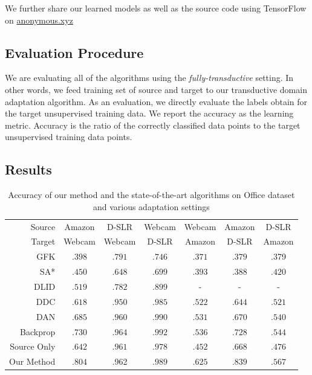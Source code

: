 We further share our learned models as well as the source code using TensorFlow\cite{tensorflow} on \url{anonymous.xyz}

\subsection{Evaluation Procedure}
We are evaluating all of the algorithms using the \emph{fully-transductive} setting. In other words,  we feed training set of source and target to our transductive domain adaptation algorithm. As an evaluation, we directly evaluate the labels obtain for the target unsupervised training data. We report the accuracy as the learning metric. Accuracy is the ratio of the correctly classified data points to the target unsupervised training data points.

\subsection{Results}
\begin{table}[t]
\caption{Accuracy of our method and the state-of-the-art algorithms on Office dataset and various adaptation settings}
\label{tab:res}
\begin{sc}
\begin{center}
\begin{small}
\begin{tabular}{@{}rcccccc@{}} \toprule 
 Source & Amazon & D-SLR & Webcam & Webcam &Amazon & D-SLR \\
 Target & Webcam & Webcam & D-SLR & Amazon & D-SLR & Amazon \\
 \midrule
GFK \cite{gong2012} & $.398$ & $.791$ & $.746 $ & $.371$ & $.379$ & .379   \\
SA* \cite{fernando13} & $.450$ & $.648$ & $.699$ & $.393$ & $.388$ & $.420$ \\
DLID \cite{chopra13} & $.519$ & $.782$ & $.899$ & -&- &- \\
DDC \cite{tzeng14} & $.618$ & $.950$ & $.985$ & $.522$ & $.644$& $.521$\\
DAN \cite{wang15} & $.685$ & $.960$ & $.990$ & $.531$ & $.670$ & $.540$ \\
Backprop \cite{ganin15} & $.730$ &$\mathbf{.964}$ & $\mathbf{.992}$ & $.536$ & $.728$ & $.544$\\
\midrule
Source Only & $.642$ & $.961$ & $.978$ & $.452$ & $.668$ & $.476$ \\
Our Method & $\mathbf{.804}$ &.962 & $.989$ & $\mathbf{.625}$ & $\mathbf{.839}$ & $\mathbf{.567}$ \\
 \bottomrule
\end{tabular}
\end{small}
\end{center}
\end{sc}
\end{table}




